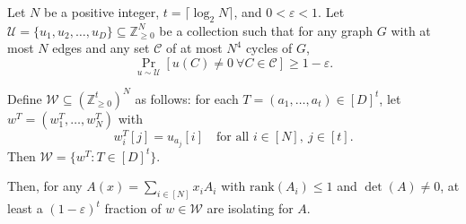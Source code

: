 \documentclass[11pt]{article}
\newcommand{\eps}{\varepsilon}
\renewcommand{\epsilon}{\eps}
\newcommand{\rank}{\mathrm{rank}}
\newcommand{\Z}{\mathbb{Z}}
\begin{document}
\begin{lemma} \label{lem:isolatingw}
Let $N$ be a positive integer, $t=\lceil \log_2 N\rceil$, and $0<\epsilon<1$. 
Let $\mathcal{U}=\{u_1,u_2,\dots,u_D\}\subseteq \Z_{\ge 0}^N$ be a collection such that for any graph $G$ with at most $N$ edges and any set $\mathcal{C}$ of at most $N^4$ cycles of $G$,
\[
\Pr_{u\sim \mathcal{U}}[u(C)\neq 0 \ \forall C\in \mathcal{C}] \ge 1-\epsilon.
\]

Define $\mathcal{W}\subseteq (\Z_{\ge 0}^t)^N$ as follows: for each $T=(a_1,\dots,a_t)\in [D]^t$, let $w^T=(w^T_1,\dots,w^T_N)$ with
\[
w^T_i[j]=u_{a_j}[i] \quad \text{for all } i\in[N],\ j\in[t].
\]
Then $\mathcal{W}=\{w^T : T\in [D]^t\}$.

Then, for any $A(x)=\sum_{i\in[N]} x_i A_i$ with $\rank(A_i)\le 1$ and $\det(A)\neq 0$, at least a $(1-\epsilon)^t$ fraction of $w\in \mathcal{W}$ are isolating for $A$.
\end{lemma}
 
\end{document}
